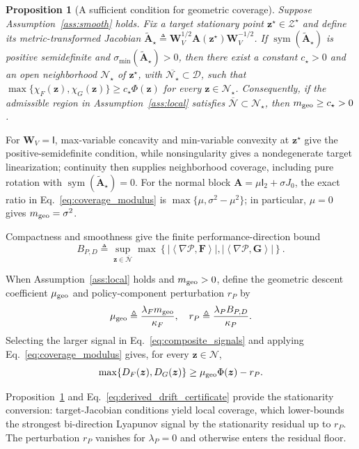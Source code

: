 \documentclass[journal]{IEEEtran}
\newtheorem{proposition}{Proposition}
\theoremstyle{remark}
\newcommand{\inner}[2]{\left\langle #1,#2\right\rangle}
\newcommand{\Id}{\mathsf{I}}
\newcommand{\sym}{\operatorname{sym}}
\newcommand{\cD}{\mathcal{D}}
\newcommand{\cN}{\mathcal{N}}
\newcommand{\bz}{\boldsymbol{z}}
\newcommand{\bW}{\boldsymbol{W}}
\newcommand{\bA}{\boldsymbol{A}}
\newcommand{\bF}{\boldsymbol{F}}
\newcommand{\bG}{\boldsymbol{G}}
\newcommand{\cP}{\mathcal{P}}
\begin{document}
	\begin{proposition}[A sufficient condition for geometric coverage]\label{prop:coverage_sufficient}
		Suppose Assumption~\ref{ass:smooth} holds.
		Fix a target stationary point $\bz^\star\in\mathcal Z^\star$ and define its metric-transformed Jacobian $\widetilde{\bA}_\star\triangleq\bW_V^{1/2}\bA(\bz^\star)\bW_V^{-1/2}$.
		If $\sym(\widetilde{\bA}_\star)$ is positive semidefinite and $\sigma_{\min}(\widetilde{\bA}_\star)>0$, then there exist a constant $c_\star>0$ and an open neighborhood $\cN_\star$ of $\bz^\star$, with $\overline{\cN_\star}\subset\cD$, such that
		\(\max\{\chi_F(\bz),\chi_G(\bz)\}\ge c_\star\Phi(\bz)\) for every $\bz\in\cN_\star$.
		Consequently, if the admissible region in Assumption~\ref{ass:local} satisfies $\overline{\cN}\subset\cN_\star$, then $m_{\rm geo}\ge c_\star>0$.
	\end{proposition}
	
	For $\bW_V=\Id$, max-variable concavity and min-variable convexity at $\bz^\star$ give the positive-semidefinite condition, while nonsingularity gives a nondegenerate target linearization; continuity then supplies neighborhood coverage, including pure rotation with $\sym(\widetilde{\bA}_\star)=0$.
	For the normal block $\bA=\mu\Id_2+\sigma J_0$, the exact ratio in Eq.~\eqref{eq:coverage_modulus} is $\max\{\mu,\sigma^2-\mu^2\}$; in particular, $\mu=0$ gives $m_{\rm geo}=\sigma^2$.
	
	Compactness and smoothness give the finite performance-direction bound
	\[
	B_{P,D}
	\triangleq
	\sup_{\bz\in\overline{\cN}}
	\max\!\left\{
	\left|\inner{\nabla\cP}{\bF}\right|,
	\left|\inner{\nabla\cP}{\bG}\right|
	\right\}.
	\]
	
	When Assumption~\ref{ass:local} holds and $m_{\rm geo}>0$, define the geometric descent coefficient $\mu_{\rm geo}$ and policy-component perturbation $r_P$ by
	\[
	\mu_{\rm geo}\triangleq\frac{\lambda_Fm_{\rm geo}}{\kappa_F},
	\quad
	r_P\triangleq\frac{\lambda_PB_{P,D}}{\kappa_P}.
	\]
	Selecting the larger signal in Eq.~\eqref{eq:composite_signals} and applying Eq.~\eqref{eq:coverage_modulus} gives, for every $\bz\in\cN$,
	\begin{equation}\label{eq:derived_drift_certificate}
		\max\{D_F(\bz),D_G(\bz)\}
		\ge
		\mu_{\rm geo}\Phi(\bz)-r_P.
	\end{equation}
	
	Proposition~\ref{prop:coverage_sufficient} and Eq.~\eqref{eq:derived_drift_certificate} provide the stationarity conversion: target-Jacobian conditions yield local coverage, which lower-bounds the strongest bi-direction Lyapunov signal by the stationarity residual up to $r_P$.
	The perturbation $r_P$ vanishes for $\lambda_P=0$ and otherwise enters the residual floor.
	
\end{document}
